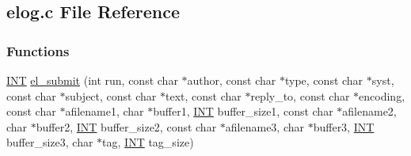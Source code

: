 \subsection{elog.c File Reference}
\label{elog_8c}
\subsubsection*{Functions}
\begin{DoxyCompactItemize}
\item 
\hyperlink{vppg_8h_a392e62da233ed3e2f7c3fd4f487a3896}{INT} \hyperlink{group__elfunctioncode_gae698a2d388573565a5673afbd3b40f9b}{el\_\-submit} (int run, const char $\ast$author, const char $\ast$type, const char $\ast$syst, const char $\ast$subject, const char $\ast$text, const char $\ast$reply\_\-to, const char $\ast$encoding, const char $\ast$afilename1, char $\ast$buffer1, \hyperlink{vppg_8h_a392e62da233ed3e2f7c3fd4f487a3896}{INT} buffer\_\-size1, const char $\ast$afilename2, char $\ast$buffer2, \hyperlink{vppg_8h_a392e62da233ed3e2f7c3fd4f487a3896}{INT} buffer\_\-size2, const char $\ast$afilename3, char $\ast$buffer3, \hyperlink{vppg_8h_a392e62da233ed3e2f7c3fd4f487a3896}{INT} buffer\_\-size3, char $\ast$tag, \hyperlink{vppg_8h_a392e62da233ed3e2f7c3fd4f487a3896}{INT} tag\_\-size)
\end{DoxyCompactItemize}

